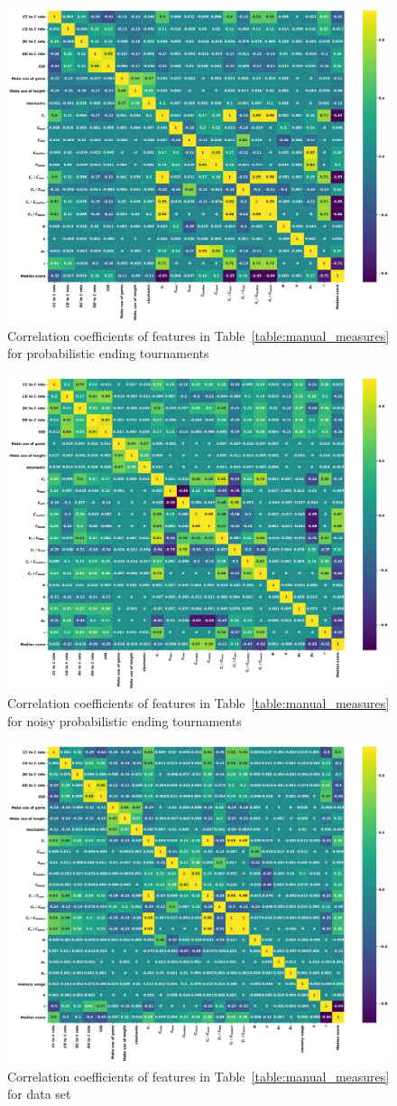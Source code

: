 \documentclass{article}
\begin{document}
\begin{figure}[!htbp]
    \begin{center}
        \includegraphics[width=.75\linewidth]{../images/probend_correlation_plot.pdf}
    \end{center}
    \caption{Correlation coefficients of features in Table~\ref{table:manual_measures}
    for probabilistic ending tournaments}
\end{figure}
\begin{figure}[!htbp]
    \begin{center}
        \includegraphics[width=.75\linewidth]{../images/probend_noise_correlation_plot.pdf}
    \end{center}
    \caption{Correlation coefficients of features in Table~\ref{table:manual_measures}
    for noisy probabilistic ending tournaments}
\end{figure}
\begin{figure}[!htbp]
    \begin{center}
        \includegraphics[width=.75\linewidth]{../images/merged_correlation_plot.pdf}
    \end{center}
    \caption{Correlation coefficients of features in Table~\ref{table:manual_measures}
    for data set}
\end{figure}
\end{document}
